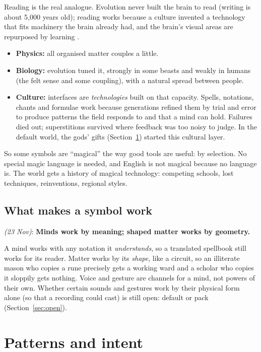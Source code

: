 \documentclass[11pt,a4paper]{article}
\newcommand{\decision}[3]{\par\smallskip\noindent{\color{dec}\textbf{Decision #1}} \textit{(#2)}: \textbf{#3}\par}
\begin{document}
Reading is the real analogue. Evolution never built the brain to read (writing is about 5{,}000 years old); reading works because a culture invented a technology that fits machinery the brain already had, and the brain's visual areas are repurposed by learning \cite{dehaene}.
\begin{itemize}
  \item \textbf{Physics:} all organised matter couples a little.
  \item \textbf{Biology:} evolution tuned it, strongly in some beasts and weakly in humans (the felt sense and some coupling), with a natural spread between people.
  \item \textbf{Culture:} interfaces are \emph{technologies} built on that capacity. Spells, notations, chants and formulae work because generations refined them by trial and error to produce patterns the field responds to and that a mind can hold. Failures died out; superstitions survived where feedback was too noisy to judge. In the default world, the gods' gifts (Section~\ref{sec:intent}) started this cultural layer.
\end{itemize}
So some symbols are ``magical'' the way good tools are useful: by selection. No special magic language is needed, and English is not magical because no language is. The world gets a history of magical technology: competing schools, lost techniques, reinventions, regional styles.

\subsection{What makes a symbol work}

\decision{FM1}{23 Nov}{Minds work by meaning; shaped matter works by geometry.}

A mind works with any notation it \emph{understands}, so a translated spellbook still works for its reader. Matter works by its \emph{shape}, like a circuit, so an illiterate mason who copies a rune precisely gets a working ward and a scholar who copies it sloppily gets nothing. Voice and gesture are channels for a mind, not powers of their own. Whether certain sounds and gestures work by their physical form alone (so that a recording could cast) is still open: default or pack (Section~\ref{sec:open}).

\section{Patterns and intent}\label{sec:intent}
\end{document}
